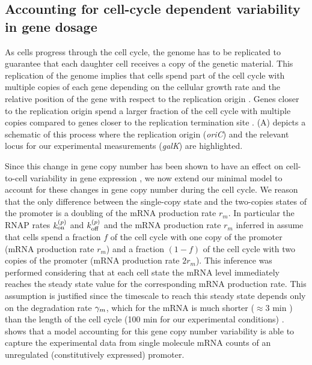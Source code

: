 \subsection{Accounting for cell-cycle dependent variability in gene dosage}
\label{sec_cell_cycle}

As cells progress through the cell cycle, the genome has to be replicated to
guarantee that each daughter cell receives a copy of the genetic material.
This replication of the genome implies that cells spend part of the cell cycle
with multiple copies of each gene depending on the cellular growth rate and the
relative position of the gene with respect to the replication origin
\cite{Bremer1996}. Genes closer to the replication origin spend a larger
fraction of the cell cycle with multiple copies compared to genes closer to the
replication termination site \cite{Bremer1996}. (A)
depicts a schematic of this process where the replication origin ({\it oriC})
and the relevant locus for our experimental measurements ({\it galK}) are
highlighted.

Since this change in gene copy number has been shown to have an effect on
cell-to-cell variability in gene expression \cite{Jones2014a, Peterson2015}, we
now extend our minimal model to account for these changes in gene copy number
during the cell cycle.  We reason that the only difference between the
single-copy state and the two-copies states of the promoter is a doubling of the
mRNA production rate $r_m$. In particular the RNAP rates $k^{(p)}_{\text{on}}$ and $k^{(p)}_{\text{off}}$
and the mRNA production rate $r_m$ inferred in 
assume that cells spend a fraction $f$ of the cell cycle  with one copy of the
promoter (mRNA production rate $r_m$) and a fraction $(1-f)$ of the cell cycle
with two copies of the promoter (mRNA production rate $2 r_m$). This inference
was performed considering that at each cell state the mRNA level immediately
reaches the steady state value for the corresponding mRNA production rate. This
assumption is justified since the timescale to reach this steady
state depends only on the degradation rate $\gamma _m$, which for the mRNA  is much
shorter ($\approx 3$ min ) than the length of the cell cycle (100 min for our
experimental conditions) \cite{Dong1995}.
 shows that a model
accounting for this gene copy number variability is able to capture the
experimental data from single molecule mRNA counts of an unregulated
(constitutively expressed) promoter.

